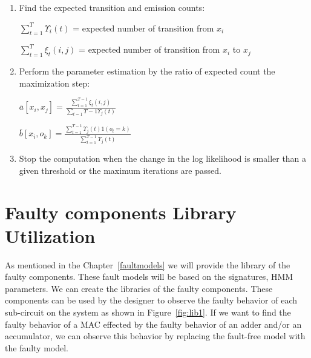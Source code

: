 \begin{enumerate}
\begin{itemize}
\end{itemize}
\item Find the expected transition and emission counts:

$\sum\limits_{t = 1}^{ T } \Upsilon_i (t)$ = expected number of transition from $x_i$

$\sum\limits_{t = 1}^{ T} \xi_t (i ,j)$ = expected number of transition from $x_i$ to $x_j$

\item Perform the parameter estimation by the ratio of expected count the maximization step:


$\overline{a}[x_i, x_j] = \frac{\sum\limits_{t = 1}^{T - 1}\xi_{t} (i, j)}{\sum\limits_{t = 1} T - 1 \Upsilon_{j}(t)} $




$\overline{b}[x_i, o_k] = \frac{\sum\limits_{t = 1}^{T - 1}\Upsilon_{j} (t) 1 (o_t = k)}{\sum\limits_{t = 1}^{T - 1} \Upsilon_{j}(t)} $

\item Stop the computation when the change in the log likelihood is smaller than a given threshold or the maximum iterations are passed.

\end{enumerate} 















\section{Faulty components Library Utilization}

As mentioned in the Chapter~\ref{faultmodels} we will provide the library of the faulty components. These fault models will be based on the signatures, HMM parameters. We can create the libraries of the faulty components. These components can be used by the designer to observe the faulty behavior of each sub-circuit on the system as shown in Figure~\ref{fig:lib1}.  If we want to find the faulty behavior of a MAC effected by the faulty behavior of an adder and/or an accumulator, we can observe this behavior by replacing the fault-free model with the faulty model.


